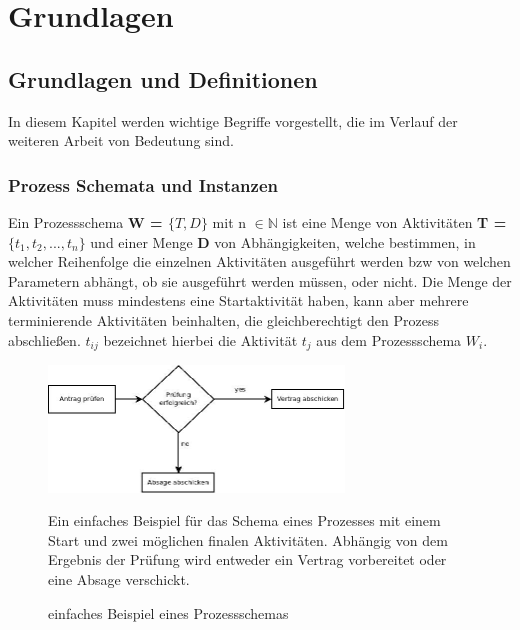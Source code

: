 
\chapter{Grundlagen} %

\label{Chapter4} %



\section{Grundlagen und Definitionen}
In diesem Kapitel werden wichtige Begriffe vorgestellt, die im Verlauf der weiteren Arbeit von Bedeutung sind.

\subsection{Prozess Schemata und Instanzen}

Ein Prozessschema \textbf{W = $\{T,D\}$} mit n $\in \mathbb{N}$ ist eine Menge von Aktivitäten \textbf{T = $\{t_1,t_2,...,t_n\}$} und einer Menge \textbf{D} von Abhängigkeiten, welche bestimmen, in welcher Reihenfolge die einzelnen Aktivitäten ausgeführt werden bzw von welchen Parametern abhängt, ob sie ausgeführt werden müssen, oder nicht. Die Menge der Aktivitäten muss mindestens eine Startaktivität haben, kann aber mehrere terminierende Aktivitäten beinhalten, die gleichberechtigt den Prozess abschließen.
$t_{ij}$ bezeichnet hierbei die Aktivität $t_j$ aus dem Prozessschema $W_i$. \\

\begin{figure}[ht]
	\centering
  \includegraphics[width=0.7\textwidth]{Figures/sampleW}

\small Ein einfaches Beispiel für das Schema eines Prozesses mit einem Start und zwei möglichen finalen Aktivitäten. Abhängig von dem Ergebnis der Prüfung wird entweder ein Vertrag vorbereitet oder eine Absage verschickt.
	\caption{einfaches Beispiel eines Prozessschemas}
	\label{fig2}
\end{figure}

